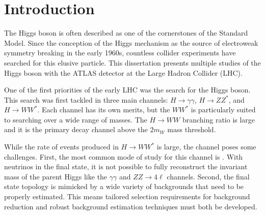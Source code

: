 \chapter{Introduction}
\label{introduction}

The Higgs boson is often described as one of the cornerstones of the Standard Model. Since the conception of the Higgs mechanism as the source of electroweak symmetry breaking in the early 1960s, countless collider experiments have searched for this elusive particle. This dissertation presents multiple studies of the Higgs boson with the ATLAS detector at the Large Hadron Collider (LHC). 

One of the first priorities of the early LHC was the search for the Higgs boson. This search was first tackled in three main channels: $H\to \gamma\gamma$, $H\to ZZ^*$, and $H\to WW^*$. Each channel has its own merits, but the $WW^*$ is particularly suited to searching over a wide range of masses. The $H\to WW$ branching ratio is large and it is the primary decay channel above the $2m_W$ mass threshold. 

While the rate of events produced in $H\to WW^*$ is large, the channel poses some challenges. First, the most common mode of study for this channel is \HWWfull. With neutrinos in the final state, it is not possible to fully reconstruct the invariant mass of the parent Higgs like the $\gamma\gamma$ and $ZZ\to 4\ell$ channels. Second, the final state topology is mimicked by a wide variety of backgrounds that need to be properly estimated. This means tailored selection requirements for background reduction and robust background estimation techniques must both be developed. 

